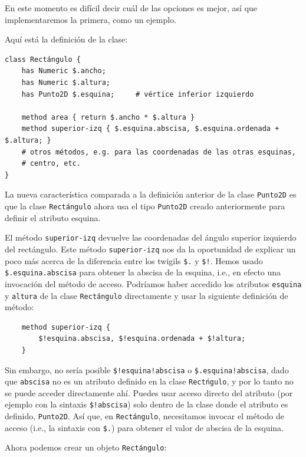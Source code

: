 En este momento es difícil decir cuál de las opciones es mejor, 
así que implementaremos la primera, como un ejemplo.

Aquí está la definición de la clase:

\begin{lstlisting}
class Rectángulo {
    has Numeric $.ancho;
    has Numeric $.altura;
    has Punto2D $.esquina;     # vértice inferior izquierdo 

    method area { return $.ancho * $.altura }
    method superior-izq { $.esquina.abscisa, $.esquina.ordenada + $.altura; }
    # otros métodos, e.g. para las coordenadas de las otras esquinas,
    # centro, etc.
}
\end{lstlisting}
%
La nueva característica comparada a la definición 
anterior de la clase {\tt Punto2D} es que la clase 
\verb|Rectángulo| ahora usa el tipo {\tt Punto2D} 
creado anteriormente para definir el atributo esquina.

El método {\tt superior-izq} devuelve las coordenadas 
del ángulo superior izquierdo del rectángulo. Este 
método {\tt superior-izq} nos da la oportunidad de explicar
un poco más acerca de la diferencia entre los twigils
\verb|$.| y \verb|$!|. Hemos usado \verb|$.esquina.abscisa|
para obtener la abscisa de la esquina, i.e., en efecto una
invocación del método de acceso. Podríamos haber accedido 
los atributos {\tt esquina} y {\tt altura} de la clase
{\tt Rectángulo} directamente y usar la siguiente definición
de método:

\begin{lstlisting}
    method superior-izq { 
    	$!esquina.abscisa, $!esquina.ordenada + $!altura;
    }
\end{lstlisting}

Sin embargo, no sería posible \verb|$!esquina!abscisa| o 
\verb|$.esquina!abscisa|, dado que {\tt abscisa} no es un 
atributo definido en la clase {\tt Rectńgulo}, y por lo tanto
no se puede acceder directamente ahí. Puedes usar acceso directo
del atributo (por ejemplo con la sintaxis \verb|$!abscisa|)
solo dentro de la clase donde el atributo es definido, {\tt Punto2D}.
Así que, en {\tt Rectángulo}, necesitamos invocar el método de
acceso (i.e., la sintaxis con \verb|$.|) para obtener el valor
de abscisa de la esquina. 

Ahora podemos crear un objeto {\tt Rectángulo}:

